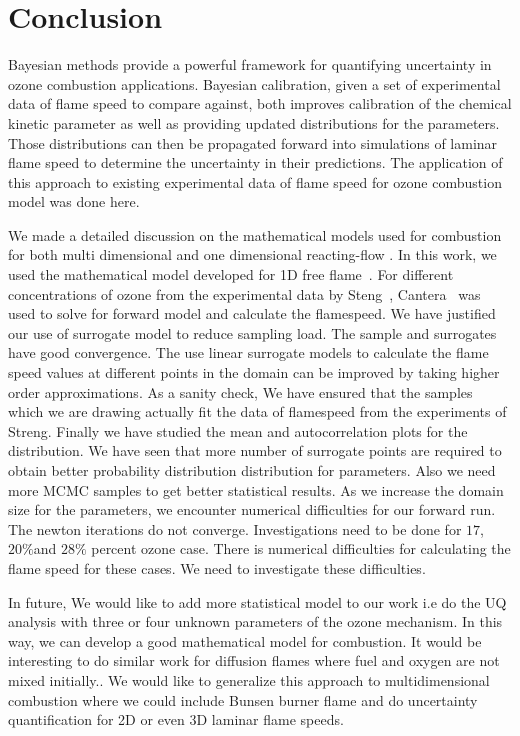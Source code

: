 
\chapter{Conclusion}\label{chap:conclusion}

Bayesian methods provide a powerful framework for quantifying uncertainty in ozone
combustion applications. Bayesian calibration, given a set of experimental data of flame speed to compare
against, both improves calibration of the chemical kinetic parameter as well as providing
updated distributions for the parameters. Those distributions can then be
propagated forward into simulations of laminar flame speed to determine the uncertainty in
their predictions. The application of this approach to existing experimental data of flame speed for ozone combustion model was done here.


We made a detailed discussion on the mathematical models used for combustion for both multi dimensional and one dimensional reacting-flow . In this work, we used the mathematical model developed for 1D free flame~\cite{Kuo}. For different concentrations of ozone from the experimental data by Steng~\cite{Streng}, Cantera~\cite{Cantera} was used to solve for forward model and calculate the flamespeed. We have justified our use of surrogate model to reduce  sampling load. The sample and surrogates have good convergence. The use linear surrogate models to calculate the flame speed values at different points in the domain can be improved by taking higher order approximations. As a sanity check, We have ensured that the samples which we are drawing actually fit the data of flamespeed from the experiments of Streng\cite{Streng}. Finally we have studied the mean and autocorrelation plots for the distribution. We have seen that more number of surrogate points are required to obtain better probability distribution distribution for parameters. Also we need more MCMC samples to get better statistical results. As we increase the domain size for the parameters, we encounter numerical difficulties for our forward run. The newton iterations do not converge. Investigations need to be done for $17$, $20 \% $and $ 28 \% $ percent ozone case. There is numerical difficulties for calculating the flame speed for these cases. We need to investigate these difficulties. 

In future, We would like to add more statistical model to our work i.e do the UQ analysis with three or four unknown parameters of the ozone mechanism. In this way, we can develop a good mathematical model for combustion. It would be interesting to do similar work for diffusion flames where fuel and oxygen are not mixed initially.. We would like to generalize this approach to multidimensional combustion where we could include Bunsen burner flame and do uncertainty quantification for 2D or even 3D laminar flame speeds.  


